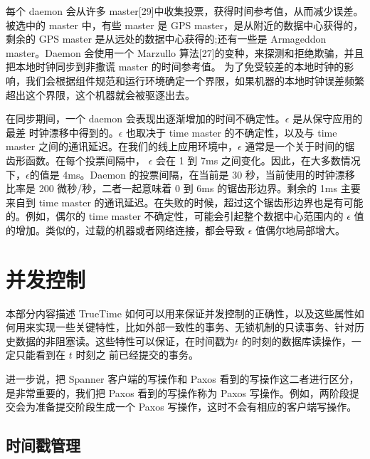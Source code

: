 \documentclass[letterpaper,twocolumn,10pt]{article}
\begin{document}
每个 daemon 会从许多 master[29]中收集投票，获得时间参考值，从而减少误差。被选中的 master 中，有些 master 是 GPS master，是从附近的数据中心获得的，剩余的 GPS master 是从远处的数据中心获得的;还有一些是 Armageddon master。Daemon 会使用一个 Marzullo 算法[27]的变种，来探测和拒绝欺骗，并且把本地时钟同步到非撒谎 master 的时间参考值。 为了免受较差的本地时钟的影响，我们会根据组件规范和运行环境确定一个界限，如果机器的本地时钟误差频繁超出这个界限，这个机器就会被驱逐出去。

在同步期间，一个 daemon 会表现出逐渐增加的时间不确定性。$\epsilon$ 是从保守应用的最差 时钟漂移中得到的。$\epsilon$ 也取决于 time master 的不确定性，以及与 time master 之间的通讯延迟。在我们的线上应用环境中，$\epsilon$ 通常是一个关于时间的锯齿形函数。在每个投票间隔中， $\epsilon$ 会在 1 到 7ms 之间变化。因此，在大多数情况下，$\epsilon$的值是 4ms。Daemon 的投票间隔，在当前是 30 秒，当前使用的时钟漂移比率是 200 微秒/秒，二者一起意味着 0 到 6ms 的锯齿形边界。剩余的 1ms 主要来自到 time master 的通讯延迟。在失败的时候，超过这个锯齿形边界也是有可能的。例如，偶尔的 time master 不确定性，可能会引起整个数据中心范围内的 $\epsilon$ 值的增加。类似的，过载的机器或者网络连接，都会导致 $\epsilon$ 值偶尔地局部增大。

\section{并发控制}

本部分内容描述 TrueTime 如何可以用来保证并发控制的正确性，以及这些属性如何用来实现一些关键特性，比如外部一致性的事务、无锁机制的只读事务、针对历史数据的非阻塞读。这些特性可以保证，在时间戳为$ t$ 的时刻的数据库读操作，一定只能看到在 $t$ 时刻之 前已经提交的事务。

进一步说，把 Spanner 客户端的写操作和 Paxos 看到的写操作这二者进行区分，是非常重要的，我们把 Paxos 看到的写操作称为 Paxos 写操作。例如，两阶段提交会为准备提交阶段生成一个 Paxos 写操作，这时不会有相应的客户端写操作。

\subsection{时间戳管理}
\end{document}
